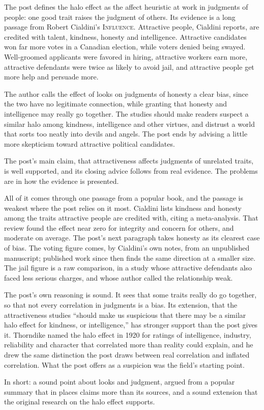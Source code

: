 \begin{afterword}
\summaryhead

The post defines the halo effect as the affect heuristic at work in judgments of people: one good trait raises the judgment of others. Its evidence is a long passage from Robert Cialdini's \textsc{Influence}. Attractive people, Cialdini reports, are credited with talent, kindness, honesty and intelligence. Attractive candidates won far more votes in a Canadian election, while voters denied being swayed. Well-groomed applicants were favored in hiring, attractive workers earn more, attractive defendants were twice as likely to avoid jail, and attractive people get more help and persuade more.

The author calls the effect of looks on judgments of honesty a clear bias, since the two have no legitimate connection, while granting that honesty and intelligence may really go together. The studies should make readers suspect a similar halo among kindness, intelligence and other virtues, and distrust a world that sorts too neatly into devils and angels. The post ends by advising a little more skepticism toward attractive political candidates.

\responsehead

The post's main claim, that attractiveness affects judgments of unrelated traits, is well supported, and its closing advice follows from real evidence. The problems are in how the evidence is presented.

All of it comes through one passage from a popular book, and the passage is weakest where the post relies on it most. Cialdini lists kindness and honesty among the traits attractive people are credited with, citing a meta-analysis. That review found the effect near zero for integrity and concern for others, and moderate on average. The post's next paragraph takes honesty as its clearest case of bias. The voting figure comes, by Cialdini's own notes, from an unpublished manuscript; published work since then finds the same direction at a smaller size. The jail figure is a raw comparison, in a study whose attractive defendants also faced less serious charges, and whose author called the relationship weak.

The post's own reasoning is sound. It sees that some traits really do go together, so that not every correlation in judgments is a bias. Its extension, that the attractiveness studies ``should make us suspicious that there may be a similar halo effect for kindness, or intelligence,'' has stronger support than the post gives it. Thorndike named the halo effect in 1920 for ratings of intelligence, industry, reliability and character that correlated more than reality could explain, and he drew the same distinction the post draws between real correlation and inflated correlation. What the post offers as a suspicion was the field's starting point.

In short: a sound point about looks and judgment, argued from a popular summary that in places claims more than its sources, and a sound extension that the original research on the halo effect supports.
\end{afterword}
